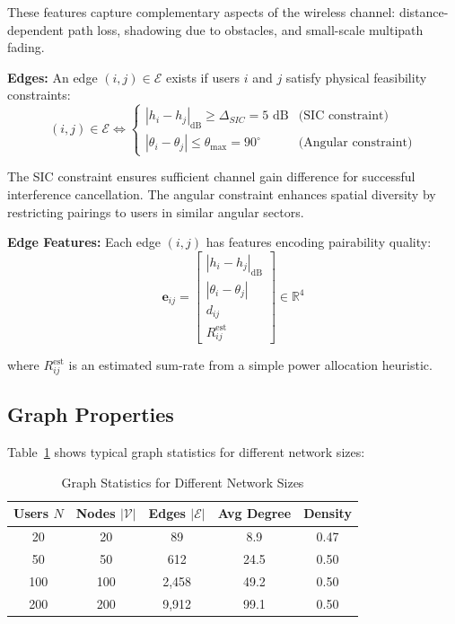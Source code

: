 These features capture complementary aspects of the wireless channel: distance-dependent path loss, shadowing due to obstacles, and small-scale multipath fading.

\textbf{Edges:} An edge $(i,j) \in \mathcal{E}$ exists if users $i$ and $j$ satisfy physical feasibility constraints:
\begin{equation}
(i,j) \in \mathcal{E} \iff 
\begin{cases}
|h_i - h_j|_{\text{dB}} \geq \Delta_{SIC} = 5 \text{ dB} & \text{(SIC constraint)} \\
|\theta_i - \theta_j| \leq \theta_{\max} = 90^\circ & \text{(Angular constraint)}
\end{cases}
\end{equation}

The SIC constraint ensures sufficient channel gain difference for successful interference cancellation. The angular constraint enhances spatial diversity by restricting pairings to users in similar angular sectors.

\textbf{Edge Features:} Each edge $(i,j)$ has features encoding pairability quality:
\begin{equation}
\mathbf{e}_{ij} = \begin{bmatrix} 
|h_i - h_j|_{\text{dB}} \\ |\theta_i - \theta_j| \\ d_{ij} \\ R_{ij}^{\text{est}}
\end{bmatrix} \in \mathbb{R}^4
\end{equation}

where $R_{ij}^{\text{est}}$ is an estimated sum-rate from a simple power allocation heuristic.

\subsection{Graph Properties}

Table~\ref{tab:graph_stats} shows typical graph statistics for different network sizes:

\begin{table}[ht]
\centering
\caption{Graph Statistics for Different Network Sizes}
\label{tab:graph_stats}
\begin{tabular}{|c|c|c|c|c|}
\hline
\textbf{Users $N$} & \textbf{Nodes $|\mathcal{V}|$} & \textbf{Edges $|\mathcal{E}|$} & \textbf{Avg Degree} & \textbf{Density} \\
\hline
20 & 20 & 89 & 8.9 & 0.47 \\
50 & 50 & 612 & 24.5 & 0.50 \\
100 & 100 & 2,458 & 49.2 & 0.50 \\
200 & 200 & 9,912 & 99.1 & 0.50 \\
\hline
\end{tabular}
\end{table}

